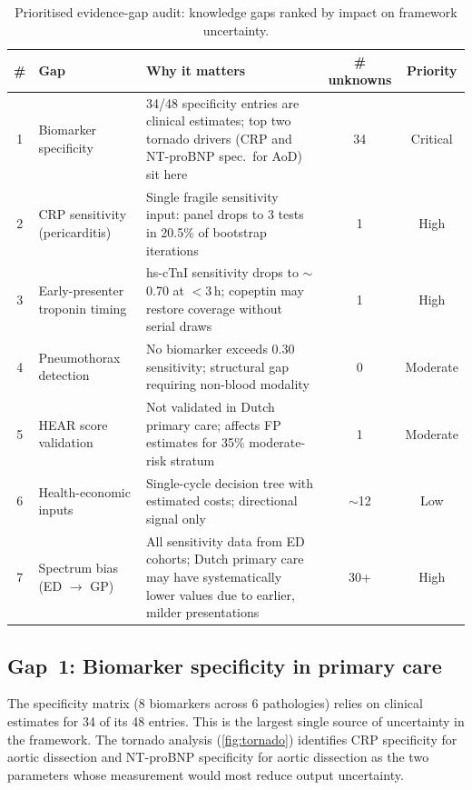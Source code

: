 \documentclass[11pt, oneside]{article}
\begin{document}
\begin{table}[h]
\centering
\caption{Prioritised evidence-gap audit: knowledge gaps ranked by impact on framework uncertainty.}
\label{tab:gaps}
\scriptsize
\setlength{\tabcolsep}{3pt}
\begin{tabular}{@{}clp{5.2cm}cc@{}}
\toprule
\textbf{\#} & \textbf{Gap} & \textbf{Why it matters} & \textbf{\# unknowns} & \textbf{Priority} \\
\midrule
1 & Biomarker specificity & 34/48 specificity entries are clinical estimates; top two tornado drivers (CRP and NT-proBNP spec.\ for AoD) sit here & 34 & Critical \\
2 & CRP sensitivity (pericarditis) & Single fragile sensitivity input: panel drops to 3 tests in 20.5\% of bootstrap iterations & 1 & High \\
3 & Early-presenter troponin timing & hs-cTnI sensitivity drops to $\sim$0.70 at $<$3\,h; copeptin may restore coverage without serial draws & 1 & High \\
4 & Pneumothorax detection & No biomarker exceeds 0.30 sensitivity; structural gap requiring non-blood modality & 0 & Moderate \\
5 & HEAR score validation & Not validated in Dutch primary care; affects FP estimates for 35\% moderate-risk stratum & 1 & Moderate \\
6 & Health-economic inputs & Single-cycle decision tree with estimated costs; directional signal only & $\sim$12 & Low \\
7 & Spectrum bias (ED $\to$ GP) & All sensitivity data from ED cohorts; Dutch primary care may have systematically lower values due to earlier, milder presentations & 30+ & High \\
\bottomrule
\end{tabular}
\par{}
\end{table}

\subsection{Gap~1: Biomarker specificity in primary care}

The specificity matrix (8 biomarkers across 6 pathologies) relies on clinical estimates for 34 of its 48 entries. This is the largest single source of uncertainty in the framework. The tornado analysis (\cref{fig:tornado}) identifies CRP specificity for aortic dissection and NT-proBNP specificity for aortic dissection as the two parameters whose measurement would most reduce output uncertainty.
\end{document}
